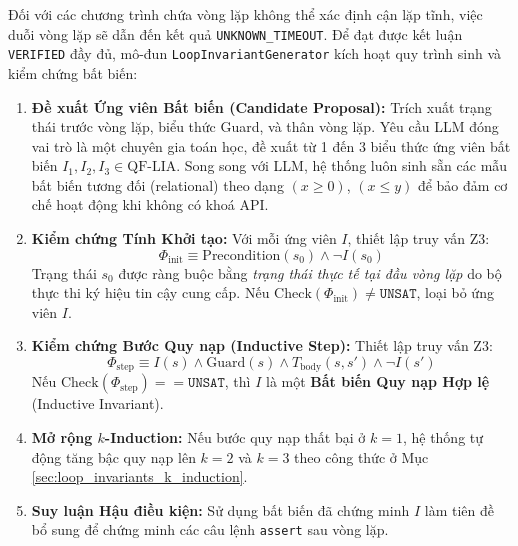 Đối với các chương trình chứa vòng lặp không thể xác định cận lặp tĩnh, việc duỗi vòng lặp sẽ dẫn đến kết quả \texttt{UNKNOWN\_TIMEOUT}. Để đạt được kết luận \texttt{VERIFIED} đầy đủ, mô-đun \texttt{LoopInvariantGenerator} kích hoạt quy trình sinh và kiểm chứng bất biến:

\begin{enumerate}
    \item \textbf{Đề xuất Ứng viên Bất biến (Candidate Proposal):} Trích xuất trạng thái trước vòng lặp, biểu thức Guard, và thân vòng lặp. Yêu cầu LLM đóng vai trò là một chuyên gia toán học, đề xuất từ 1 đến 3 biểu thức ứng viên bất biến $I_1, I_2, I_3 \in \text{QF-LIA}$. Song song với LLM, hệ thống luôn sinh sẵn các mẫu bất biến tương đối (relational) theo dạng $(x \geq 0)$, $(x \leq y)$ để bảo đảm cơ chế hoạt động khi không có khoá API.
    \item \textbf{Kiểm chứng Tính Khởi tạo:} Với mỗi ứng viên $I$, thiết lập truy vấn Z3:
    \begin{equation}
    \Phi_{\text{init}} \equiv \text{Precondition}(s_0) \land \neg I(s_0)
    \end{equation}
    Trạng thái $s_0$ được ràng buộc bằng \emph{trạng thái thực tế tại đầu vòng lặp} do bộ thực thi ký hiệu tin cậy cung cấp. Nếu $\text{Check}(\Phi_{\text{init}}) \ne \texttt{UNSAT}$, loại bỏ ứng viên $I$.
    \item \textbf{Kiểm chứng Bước Quy nạp (Inductive Step):} Thiết lập truy vấn Z3:
    \begin{equation}
    \Phi_{\text{step}} \equiv I(s) \land \text{Guard}(s) \land T_{\text{body}}(s, s') \land \neg I(s')
    \end{equation}
    Nếu $\text{Check}(\Phi_{\text{step}}) == \texttt{UNSAT}$, thì $I$ là một \textbf{Bất biến Quy nạp Hợp lệ} (Inductive Invariant).
    \item \textbf{Mở rộng $k$-Induction:} Nếu bước quy nạp thất bại ở $k=1$, hệ thống tự động tăng bậc quy nạp lên $k=2$ và $k=3$ theo công thức ở Mục \ref{sec:loop_invariants_k_induction}.
    \item \textbf{Suy luận Hậu điều kiện:} Sử dụng bất biến đã chứng minh $I$ làm tiên đề bổ sung để chứng minh các câu lệnh \texttt{assert} sau vòng lặp.
\end{enumerate}

